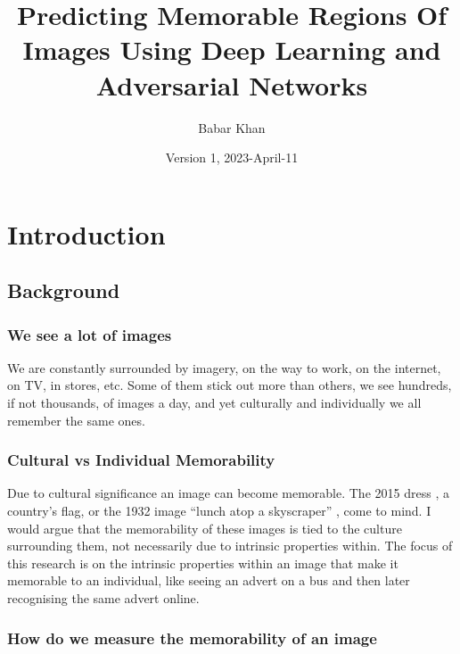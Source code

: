 \documentclass{UoYCSproject}
\author{Babar Khan}
\title{Predicting Memorable Regions Of Images Using Deep Learning and Adversarial Networks}
\date{Version 1, 2023-April-11}
\begin{document}
\maketitle

\newpage{}

\tableofcontents

\newpage{}

\section{Introduction}


\subsection{Background}

\subsubsection{We see a lot of images}

We are constantly surrounded by imagery, on the way to work, on the internet, on TV, in stores, etc. Some of them stick out more than others, we see hundreds, if not thousands, of images a day, and yet culturally and individually we all remember the same ones.

\subsubsection{Cultural vs Individual Memorability}

Due to cultural significance an image can become memorable. The 2015 dress \cite{BBCDress2015}, a country's flag, or the 1932 image “lunch atop a skyscraper” \cite{gambino_2012}, come to mind. I would argue that the memorability of these images is tied to the culture surrounding them, not necessarily due to intrinsic properties within. The focus of this research is on the intrinsic properties within an image that make it memorable to an individual, like seeing an advert on a bus and then later recognising the same advert online.

\subsubsection{How do we measure the memorability of an image}

\end{document}
